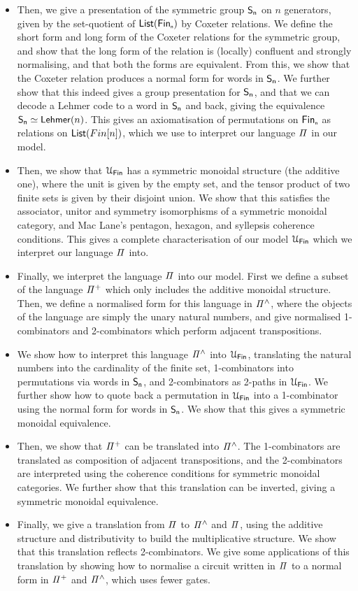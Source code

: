 \begin{itemize}[leftmargin=*]
\item Then, we give a presentation of the symmetric group $\Sn[n]$ on $n$ generators, given by the set-quotient of $\List[\Fin[n]]$ by Coxeter relations. We define the short form and long form of the Coxeter relations for the symmetric group, and show that the long form of the relation is (locally) confluent and strongly normalising, and that both the forms are equivalent. From this, we show that the Coxeter relation produces a normal form for words in $\Sn$. We further show that this indeed gives a group presentation for $\Sn$, and that we can decode a Lehmer code to a word in $\Sn[n]$ and back, giving the equivalence $\Sn[n] \eqv \Lehmer[n]$. This gives an axiomatisation of permutations on $\Fin[n]$ as relations on $\List[Fin[n]]$, which we use to interpret our language $\mathit{\Pi}$ in our model.
\item Then, we show that $\UFin$ has a symmetric monoidal structure (the additive one), where the unit is given by the empty set, and the tensor product of two finite sets is given by their disjoint union. We show that this satisfies the associator, unitor and symmetry isomorphisms of a symmetric monoidal category, and Mac Lane's pentagon, hexagon, and syllepsis coherence conditions. This gives a complete characterisation of our model $\UFin$ which we interpret our language $\mathit{\Pi}$ into.
\item Finally, we interpret the language $\mathit{\Pi}$ into our model. First we define a subset of the language $\mathit{{\Pi}^{+}}$ which only includes the additive monoidal structure. Then, we define a normalised form for this language in $\mathit{{\Pi}^{\wedge}}$, where the objects of the language are simply the unary natural numbers, and give normalised 1-combinators and 2-combinators which perform adjacent transpositions.
\item We show how to interpret this language $\mathit{{\Pi}^{\wedge}}$ into $\UFin$, translating the natural numbers into the cardinality of the finite set, 1-combinators into permutations via words in $\Sn$, and 2-combinators as 2-paths in $\UFin$. We further show how to quote back a permutation in $\UFin$ into a 1-combinator using the normal form for words in $\Sn$. We show that this gives a symmetric monoidal equivalence.
\item Then, we show that $\mathit{{\Pi}^{+}}$ can be translated into $\mathit{{\Pi}^{\wedge}}$. The 1-combinators are translated as composition of adjacent transpositions, and the 2-combinators are interpreted using the coherence conditions for symmetric monoidal categories. We further show that this translation can be inverted, giving a symmetric monoidal equivalence.
\item Finally, we give a translation from $\mathit{\Pi}$ to $\mathit{{\Pi}^{\wedge}}$ and $\mathit{\Pi}$, using the additive structure and distributivity to build the multiplicative structure. We show that this translation reflects 2-combinators. We give some applications of this translation by showing how to normalise a circuit written in $\mathit{\Pi}$ to a normal form in $\mathit{{\Pi}^{+}}$ and $\mathit{{\Pi}^{\wedge}}$, which uses fewer gates.
\end{itemize}

